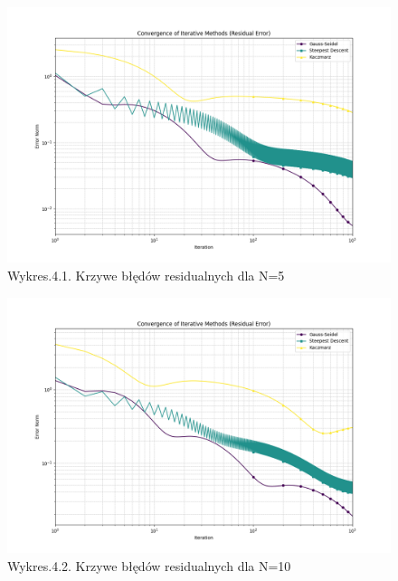 \documentclass{article}
\begin{document}
\begin{figure}[H]%
  \centering%
  \includegraphics[width=1.5\textwidth, center]{zad4_1.png}%
  \caption*{Wykres.4.1. Krzywe błędów residualnych dla N=5}%
\end{figure}%

\begin{figure}[H]
  \includegraphics[width=1.5\textwidth, center]{zad4_2.png}
  \centering
  \captionsetup[Tabela]{name=New Table Name}
  \caption*{Wykres.4.2. Krzywe błędów residualnych dla N=10}
\end{figure}
\end{document}
